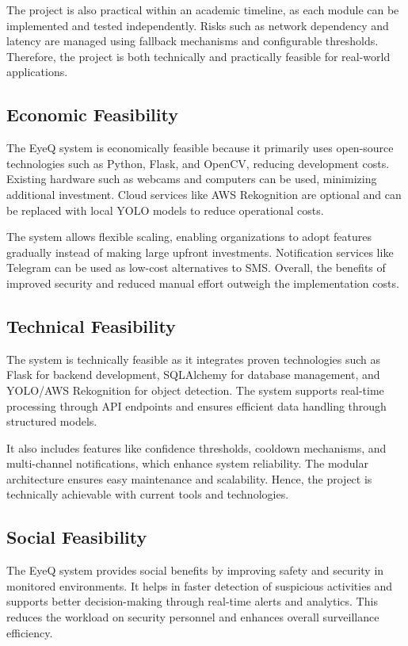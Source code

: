 \documentclass[10pt,openany]{report}
\begin{document}
\begin{sloppypar}
{{{\begin{sloppypar}
The project is also practical within an academic timeline, as each module can be implemented and tested independently. Risks such as network dependency and latency are managed using fallback mechanisms and configurable thresholds. Therefore, the project is both technically and practically feasible for real-world applications.

\subsection{Economic Feasibility}

The EyeQ system is economically feasible because it primarily uses open-source technologies such as Python, Flask, and OpenCV, reducing development costs. Existing hardware such as webcams and computers can be used, minimizing additional investment. Cloud services like AWS Rekognition are optional and can be replaced with local YOLO models to reduce operational costs.

The system allows flexible scaling, enabling organizations to adopt features gradually instead of making large upfront investments. Notification services like Telegram can be used as low-cost alternatives to SMS. Overall, the benefits of improved security and reduced manual effort outweigh the implementation costs.

\subsection{Technical Feasibility}

The system is technically feasible as it integrates proven technologies such as Flask for backend development, SQLAlchemy for database management, and YOLO/AWS Rekognition for object detection. The system supports real-time processing through API endpoints and ensures efficient data handling through structured models.

It also includes features like confidence thresholds, cooldown mechanisms, and multi-channel notifications, which enhance system reliability. The modular architecture ensures easy maintenance and scalability. Hence, the project is technically achievable with current tools and technologies.

\subsection{Social Feasibility}

The EyeQ system provides social benefits by improving safety and security in monitored environments. It helps in faster detection of suspicious activities and supports better decision-making through real-time alerts and analytics. This reduces the workload on security personnel and enhances overall surveillance efficiency.


\end{sloppypar}}}}
\end{sloppypar}
\end{document}
